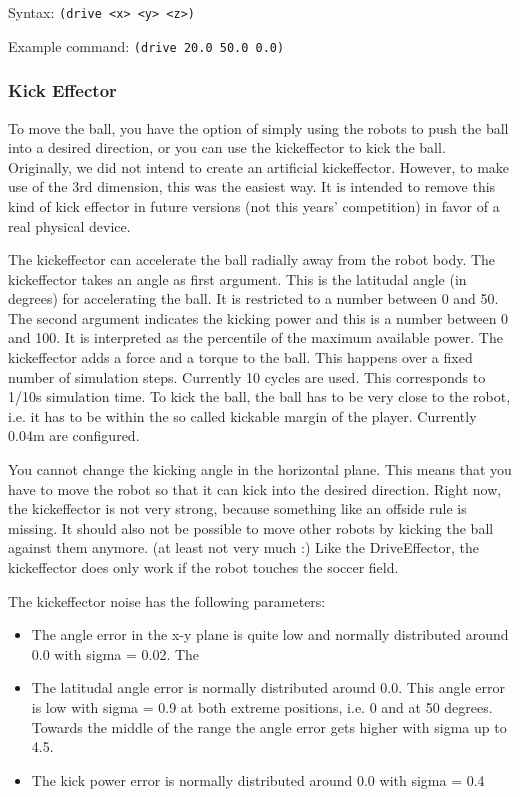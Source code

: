 Syntax: \texttt{(drive <x> <y> <z>)}

Example command: \texttt{(drive 20.0 50.0 0.0)}

\subsubsection{Kick Effector}

To move the ball, you have the option of simply using the robots to
push the ball into a desired direction, or you can use the
kickeffector to kick the ball. Originally, we did not intend to create
an artificial kickeffector. However, to make use of the 3rd dimension,
this was the easiest way. It is intended to remove this kind of kick
effector in future versions (not this years' competition) in favor of
a real physical device.

The kickeffector can accelerate the ball radially away from the robot
body. The kickeffector takes an angle as first argument. This is the
latitudal angle (in degrees) for accelerating the ball. It is
restricted to a number between 0 and 50. The second argument indicates
the kicking power and this is a number between 0 and 100. It is
interpreted as the percentile of the maximum available power. The
kickeffector adds a force and a torque to the ball. This happens over
a fixed number of simulation steps. Currently 10 cycles are used. This
corresponds to 1/10s simulation time. To kick the ball, the ball has
to be very close to the robot, i.e. it has to be within the so called
kickable margin of the player. Currently 0.04m are configured.

You cannot change the kicking angle in the horizontal plane. This
means that you have to move the robot so that it can kick into the
desired direction. Right now, the kickeffector is not very strong,
because something like an offside rule is missing. It should also not
be possible to move other robots by kicking the ball against them
anymore. (at least not very much :) Like the DriveEffector, the
kickeffector does only work if the robot touches the soccer field.

The kickeffector noise has the following parameters: 

\begin{itemize}
  
\item The angle error in the x-y plane is quite low and normally
  distributed around 0.0 with sigma = 0.02. The

\item The latitudal angle error is normally distributed around 0.0.
  This angle error is low with sigma = 0.9 at both extreme positions,
  i.e. 0 and at 50 degrees. Towards the middle of the range the angle
  error gets higher with sigma up to 4.5.
  
\item The kick power error is normally distributed around 0.0 with
  sigma = 0.4

\end{itemize}

